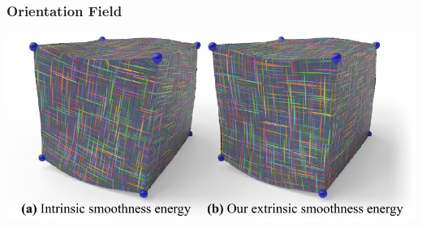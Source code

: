 \documentclass[aspectratio=43,sanserif,professionalfonts]{beamer}
\begin{document}
\begin{frame}
	\frametitle{Orientation Field}
	\centering
	\includegraphics[width=\textwidth]{img/orientation-field-illustration.png}
\end{frame}
\end{document}

